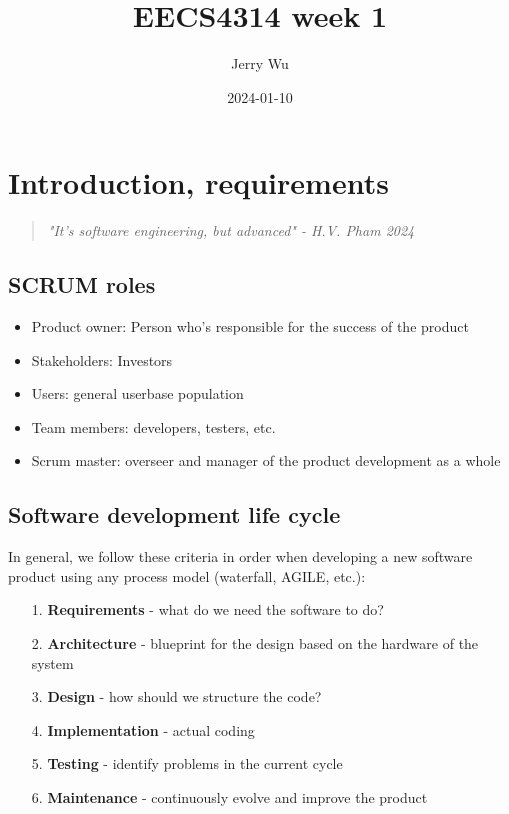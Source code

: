 \documentclass[12pt]{book}
\title{EECS4314 week 1}
\author{Jerry Wu}
\date{2024-01-10}
\begin{document}
\maketitle
\tableofcontents



\chapter{Introduction, requirements}

\begin{quote}
    \textit{"It's software engineering, but advanced" - H.V. Pham 2024}
\end{quote}

\newpage
\section*{SCRUM roles}

\begin{itemize}
  \item Product owner: Person who's responsible for the success of the product
  \item Stakeholders: Investors 
  \item Users: general userbase population
  \item Team members: developers, testers, etc.
  \item Scrum master: overseer and manager of the product development as a whole
\end{itemize}

\section*{Software development life cycle}
In general, we follow these criteria in order when developing a new software product using any process model (waterfall, AGILE, etc.):

\begin{itemize}
  \item[1.] \textbf{Requirements} - what do we need the software to do?
  \item[2.] \textbf{Architecture} - blueprint for the design based on the hardware of the system
  \item[3.] \textbf{Design} - how should we structure the code?
  \item[4.] \textbf{Implementation} - actual coding
  \item[5.] \textbf{Testing} - identify problems in the current cycle
  \item[6.] \textbf{Maintenance} - continuously evolve and improve the product
\end{itemize}
\end{document}

